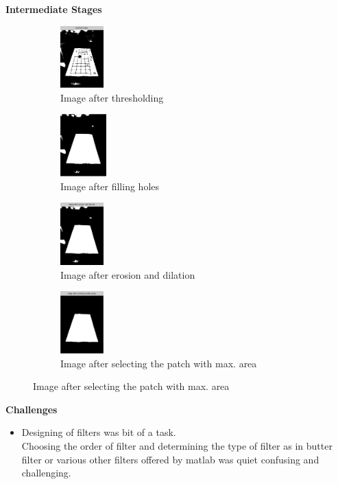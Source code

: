 \documentclass[10pt, a4paper]{beamer}
\begin{document}
\begin{frame}
		\textbf{Intermediate Stages}
		\begin{figure}[h!]
			\begin{subfigure}{0.4\textwidth}
				\includegraphics[width=0.6\linewidth, height=2.4cm]{Filtering/2.jpg}
				\caption{Image after thresholding}
			\end{subfigure}
			\begin{subfigure}{0.4\textwidth}
				\includegraphics[width=0.6\linewidth, height=2.4cm]{Filtering/3.jpg}
				\caption{Image after filling holes}
			\end{subfigure}
			\begin{subfigure}{0.4\textwidth}
				\includegraphics[width=0.6\linewidth, height=2.4cm]{Filtering/4.jpg} 
				\caption{Image after erosion and dilation}
			\end{subfigure}
			\begin{subfigure}{0.4\textwidth}
				\includegraphics[width=0.6\linewidth, height=2.4cm]{Filtering/5.jpg}
				\caption{Image after selecting the patch with max. area}
			\end{subfigure}
		\end{figure}
\end{frame}

\begin{frame}
	\textbf{Challenges}
	\begin{itemize}
		\item {Designing of filters was bit of a task.}\\
		Choosing the order of filter and determining the type of filter as in butter filter or various other filters offered by matlab was quiet confusing and challenging.
	\end{itemize}
	
\end{frame}
\end{document}
